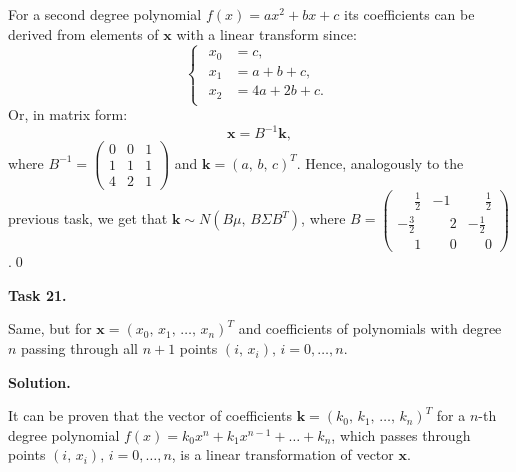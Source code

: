 \documentclass[14pt,a4paper]{extarticle}
\begin{document}
	For a second degree polynomial $f(x)=ax^2+bx+c$ its coefficients can be derived from elements of $\bm{x}$ with a linear transform since:
	\begin{equation*}
		\begin{cases}
			\begin{aligned}
				x_0 &= c,\\
				x_1 &= a+b+c,\\
				x_2 &= 4a+2b+c.
			\end{aligned}
		\end{cases}
	\end{equation*}
	Or, in matrix form:
	\[\bm{x}=B^{-1}\bm{k},\]
	where $B^{-1}=\begin{pmatrix}0&0&1\\1&1&1\\4&2&1\end{pmatrix}$ and $\bm{k}=(a,\, b,\, c)^T$. Hence, analogously to the previous task, we get that $\bm{k} \sim N(B\mu,\, B\Sigma B^T)$, where $B=\begin{pmatrix}\phantom{-}\frac{1}{2}&-1&\phantom{-}\frac{1}{2}\\-\frac{3}{2}&\phantom{-}2&-\frac{1}{2}\\\phantom{-}1&\phantom{-}0&\phantom{-}0\end{pmatrix}$.\qed
	\newpage
	
	\noindent\textbf{Task 21.}
	
	Same, but for $\bm{x}=(x_0,\, x_1,\,\dots,\, x_{n})^T$ and coefficients of polynomials with degree $n$ passing through all $n+1$ points $(i,\, x_i),\, i=0,\dots,n$.
	
	\noindent\textbf{Solution.}
	
	It can be proven that the vector of coefficients $\bm{k}=(k_0,\, k_1,\,\dots,\, k_{n})^T$ for a $n$-th degree polynomial $f(x)=k_0x^{n}+k_1x^{n-1}+\dots+k_{n}$, which passes through points $(i,\, x_i),\, i=0,\dots,n$, is a linear transformation of vector $\bm{x}$.
\end{document}
